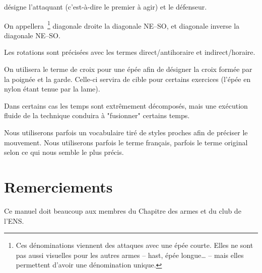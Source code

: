 \A désigne l'attaquant (c'est-à-dire le premier à agir) et \D le défenseur.

On appellera~\footnote{Ces dénominations viennent des attaques avec une épée courte. Elles ne sont pas aussi visuelles pour les autres armes – hast, épée longue… – mais elles permettent d'avoir une dénomination unique.} diagonale droite la diagonale NE–SO, et diagonale inverse la diagonale NE–SO.

Les rotations sont précisées avec les termes direct/antihoraire et indirect/horaire.

On utilisera le terme de croix pour une épée afin de désigner la croix formée par la poignée et la garde.
Celle-ci servira de cible pour certains exercices (l'épée en nylon étant tenue par la lame).

Dans certains cas les temps sont extrêmement décomposés, mais une exécution fluide de la technique conduira à "fusionner" certains temps.

Nous utiliserons parfois un vocabulaire tiré de styles proches afin de préciser le mouvement.
Nous utiliserons parfois le terme français, parfois le terme original selon ce qui nous semble le plus précis.


\section{Remerciements}


Ce manuel doit beaucoup aux membres du Chapitre des armes et du club de l'ENS.
